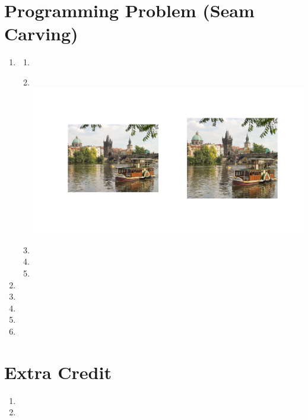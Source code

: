 \documentclass{article}
\begin{document}
\label{Programming Problem (Seam Carving)}
\section{Programming Problem (Seam Carving)}
\begin{enumerate}
	\item 
	\begin{enumerate}
		\item
		\item \\
		\includegraphics[width=\linewidth]{../matlab/outputPrague.png}
		\item
		\item
		\item 
	\end{enumerate}
	\item
	\item
	\item
	\item
	\item 
\end{enumerate}
\pagebreak

\label{Extra Credit}
\section{Extra Credit}
\begin{enumerate}
	\item
	\item 
\end{enumerate}
\end{document}

